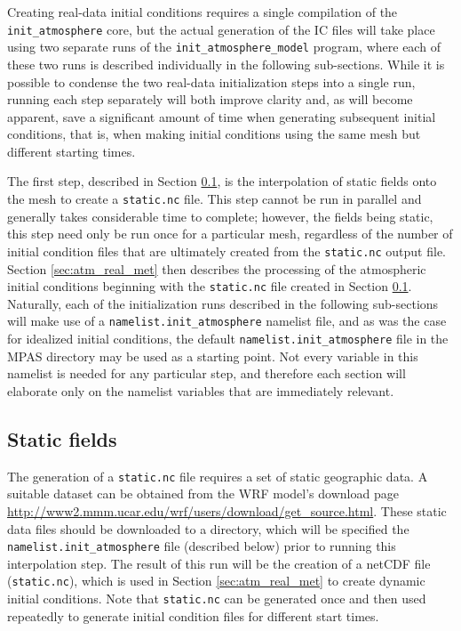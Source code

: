 Creating real-data initial conditions requires a single compilation of the {\tt init\_atmosphere} core, but the actual generation of
the IC files will take place using two separate runs of the {\tt init\_atmosphere\_model} program, where each of these two runs is described individually in the following sub-sections.  While it is possible to condense the two real-data initialization steps into a single run, running each step separately will both improve clarity and, as will become apparent, save a significant amount of time when generating subsequent initial conditions, that is, when making initial conditions using the same mesh but different starting times.

The first step, described in Section \ref{sec:atm_real_static}, is the interpolation of static fields onto the mesh to
create a {\tt static.nc} file.  This step cannot be run in parallel and generally takes considerable time to complete;
however, the fields being static, this step need only be run once for a particular mesh, regardless of the number of initial
condition files that are ultimately created from the {\tt static.nc} output file. Section \ref{sec:atm_real_met} then describes the processing of the atmospheric initial conditions beginning with the {\tt static.nc} file created in Section \ref{sec:atm_real_static}.  Naturally, each of the initialization runs described in the following sub-sections will make use of a {\tt namelist.init\_atmosphere} namelist file, and as was the case for idealized initial conditions, the default {\tt namelist.init\_atmosphere} file in the MPAS directory may be used as a starting point.  Not every variable in this namelist is needed for any particular step, and therefore each section will elaborate only on the namelist variables that are immediately relevant.

\subsection{Static fields}
\label{sec:atm_real_static}

The generation of a {\tt static.nc} file requires a set of static geographic data.  A suitable dataset can be obtained from the WRF model's download page \\
 \url{http://www2.mmm.ucar.edu/wrf/users/download/get\_source.html}.  These static data files should be downloaded to a directory,
which will be specified the {\tt namelist.init\_atmosphere} file (described below) prior to running this interpolation step.  The
result of this run will be the creation of a netCDF file ({\tt static.nc}), which is used in Section \ref{sec:atm_real_met} to create dynamic initial conditions.  Note that {\tt static.nc} can be generated once and then used repeatedly to generate initial condition files for different start times.

